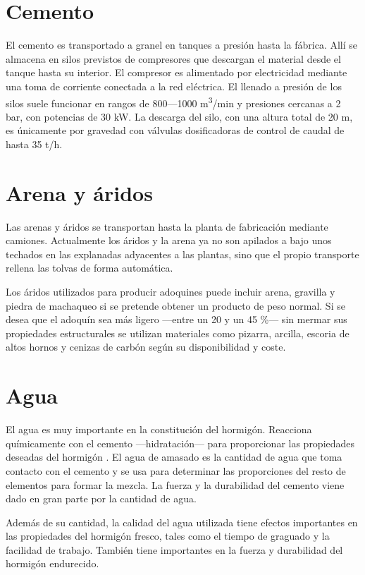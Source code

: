 \section{Cemento}
El cemento es transportado a granel en tanques a presión hasta la fábrica. Allí se almacena en silos previstos de compresores que descargan el material desde el tanque hasta su interior. El compresor es alimentado por electricidad mediante una toma de corriente conectada a la red eléctrica. El llenado a presión de los silos suele funcionar en rangos de 800—1000 \si{\cubic\meter/\minute} y presiones cercanas a 2 \si{\bar}, con potencias de 30 \si{\kilo\watt}. La descarga del silo, con una altura total de 20 \si{\meter}, es únicamente por gravedad con válvulas dosificadoras de control de caudal de hasta 35 \si{\tonne/\hour}.

\section{Arena y áridos}
Las arenas y áridos se transportan hasta la planta de fabricación mediante camiones. Actualmente los áridos y la arena ya no son apilados a bajo unos techados en las explanadas adyacentes a las plantas, sino que el propio transporte rellena las tolvas de forma automática.

Los áridos utilizados para producir adoquines puede incluir arena, gravilla y piedra de machaqueo si se pretende obtener un producto de peso normal. Si se desea que el adoquín sea más ligero —entre un 20 y un 45 \%— sin mermar sus propiedades estructurales se utilizan materiales como pizarra, arcilla, escoria de altos hornos y cenizas de carbón según su disponibilidad y coste.

\section{Agua}
El agua es muy importante en la constitución del hormigón. Reacciona químicamente con el cemento —hidratación— para proporcionar las propiedades deseadas del hormigón \cite{nrmca}. El agua de amasado es la cantidad de agua que toma contacto con el cemento y se usa para determinar las proporciones del resto de elementos para formar la mezcla. La fuerza y la durabilidad del cemento viene dado en gran parte por la cantidad de agua.

Además de su cantidad, la calidad del agua utilizada tiene efectos importantes en las propiedades del hormigón fresco, tales como el tiempo de graguado y la facilidad de trabajo. También tiene importantes en la fuerza y durabilidad del hormigón endurecido.

